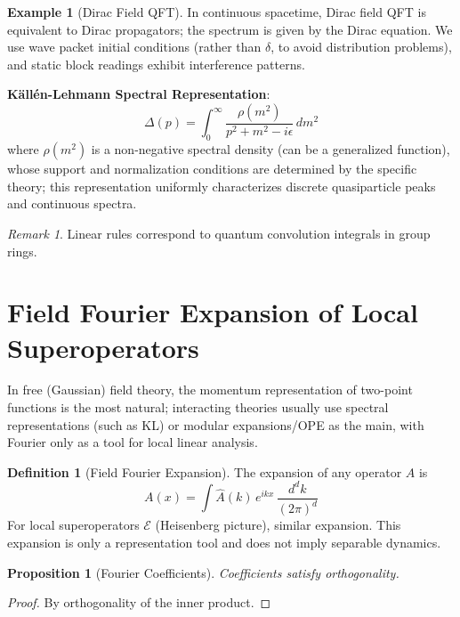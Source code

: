 \documentclass[11pt]{article}
\newtheorem{proposition}[theorem]{Proposition}
\theoremstyle{definition}
\newtheorem{definition}[theorem]{Definition}
\newtheorem{example}[theorem]{Example}
\theoremstyle{remark}
\newtheorem{remark}[theorem]{Remark}
\begin{document}
\begin{example}[Dirac Field QFT]\label{ex:dirac}
In continuous spacetime, Dirac field QFT is equivalent to Dirac propagators; the spectrum is given by the Dirac equation. We use wave packet initial conditions (rather than \( \delta \), to avoid distribution problems), and static block readings exhibit interference patterns.

\textbf{Källén-Lehmann Spectral Representation}:
\[
\Delta(p)=\int_{0}^{\infty}\frac{\rho(m^2)}{p^2+m^2-i\epsilon}\,dm^2
\]
where \( \rho(m^2) \) is a non-negative spectral density (can be a generalized function), whose support and normalization conditions are determined by the specific theory; this representation uniformly characterizes discrete quasiparticle peaks and continuous spectra.
\end{example}

\begin{remark}
Linear rules correspond to quantum convolution integrals in group rings.
\end{remark}

\section{Field Fourier Expansion of Local Superoperators}\label{sec:fourier}

In free (Gaussian) field theory, the momentum representation of two-point functions is the most natural; interacting theories usually use spectral representations (such as KL) or modular expansions/OPE as the main, with Fourier only as a tool for local linear analysis.

\begin{definition}[Field Fourier Expansion]\label{def:fourierexp}
The expansion of any operator \( A \) is
\[
A(x) = \int \widehat{A}(k) \, e^{i k x} \, \frac{d^d k}{(2\pi)^d}
\]
For local superoperators \( \mathcal{E} \) (Heisenberg picture), similar expansion. This expansion is only a representation tool and does not imply separable dynamics.
\end{definition}

\begin{proposition}[Fourier Coefficients]\label{prop:fouriercoeff}
Coefficients satisfy orthogonality.
\end{proposition}

\begin{proof}
By orthogonality of the inner product.
\end{proof}
\end{document}
